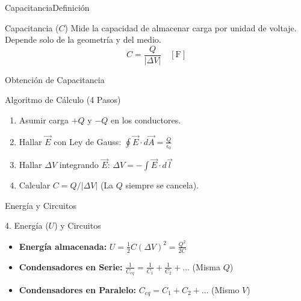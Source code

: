 \documentclass[10pt, aspectratio=169]{beamer}
\begin{document}
\primeraDiapo

\begin{frame}{Capacitancia}{Definición}
    \begin{boxTeoria}{Capacitancia ($C$)}
        Mide la capacidad de almacenar carga por unidad de voltaje. Depende solo de la geometría y del medio.
        \begin{equation*}
            C = \frac{Q}{|\Delta V|} \quad [\unit{\F}]
        \end{equation*}
    \end{boxTeoria}
\end{frame}

\begin{frame}{Obtención de Capacitancia}
    \begin{boxTeoria}{Algoritmo de Cálculo (4 Pasos)}
        \begin{enumerate}
            \item Asumir carga $+Q$ y $-Q$ en los conductores.
            \item Hallar $\vec{E}$ con Ley de Gauss: $\oint \vec{E} \cdot d\vec{A} = \frac{Q}{\epsilon_0}$
            \item Hallar $\Delta V$ integrando $\vec{E}$: $\Delta V = -\int \vec{E} \cdot d\vec{l}$
            \item Calcular $C = Q / |\Delta V|$ (La $Q$ siempre se cancela).
        \end{enumerate}
    \end{boxTeoria}
\end{frame}

\begin{frame}{Energía y Circuitos}
    \begin{boxTeoria}{4. Energía ($U$) y Circuitos}
        \begin{itemize}
            \item \textbf{Energía almacenada:} $U = \frac{1}{2} C (\Delta V)^2 = \frac{Q^2}{2C}$
            \item \textbf{Condensadores en Serie:} $\frac{1}{C_{eq}} = \frac{1}{C_1} + \frac{1}{C_2} + \dots$ (Misma $Q$)
            \item \textbf{Condensadores en Paralelo:} $C_{eq} = C_1 + C_2 + \dots$ (Mismo $V$)
        \end{itemize}
    \end{boxTeoria}

\end{frame}
\end{document}
